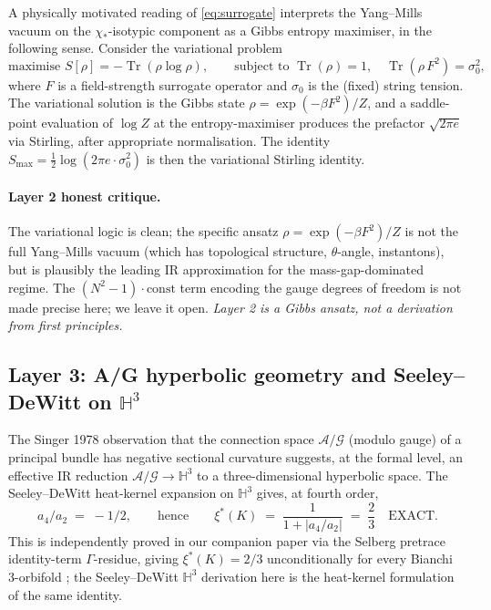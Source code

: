 \documentclass[11pt,a4paper,reqno]{amsart}
\theoremstyle{definition}
\DeclareMathOperator{\Tr}{Tr}
\newcommand{\HH}{\mathbb{H}}
\newcommand{\xis}{\xi^{*}}
\begin{document}
A physically motivated reading of \eqref{eq:surrogate} interprets
the Yang--Mills vacuum on the $\chi_*$-isotypic component as a
Gibbs entropy maximiser, in the following sense. Consider the
variational problem
\[
   \text{maximise } S[\rho] = -\Tr(\rho\log\rho), \qquad
   \text{subject to } \Tr(\rho) = 1, \quad \Tr(\rho\,F^2) = \sigma_0^2,
\]
where $F$ is a field-strength surrogate operator and $\sigma_0$ is
the (fixed) string tension. The variational solution is the Gibbs
state $\rho = \exp(-\beta F^2)/Z$, and a saddle-point evaluation
of $\log Z$ at the entropy-maximiser produces the prefactor
$\sqrt{2\pi e}$ via Stirling, after appropriate normalisation. The
identity $S_{\max} = \tfrac 12\log(2\pi e\cdot \sigma_0^2)$ is then
the variational Stirling identity.

\paragraph{Layer 2 honest critique.}
The variational logic is clean; the specific ansatz $\rho =
\exp(-\beta F^2)/Z$ is not the full Yang--Mills vacuum (which has
topological structure, $\theta$-angle, instantons), but is plausibly
the leading IR approximation for the mass-gap-dominated regime.
The $(N^2-1)\cdot\text{const}$ term encoding the gauge degrees of
freedom is not made precise here; we leave it open. \emph{Layer 2
is a Gibbs ansatz, not a derivation from first principles.}

\subsection{Layer 3: A/G hyperbolic geometry and Seeley--DeWitt
on $\HH^3$}\label{ss:layer3}

The Singer 1978 observation that the connection space
$\mathcal{A}/\mathcal{G}$ (modulo gauge) of a principal bundle has
negative sectional curvature \cite{Singer1978} suggests, at the
formal level, an effective IR reduction $\mathcal{A}/\mathcal{G}
\to \HH^3$ to a three-dimensional hyperbolic space. The
Seeley--DeWitt heat-kernel expansion on $\HH^3$ gives, at fourth
order,
\[
   a_4/a_2 \;=\; -1/2,
   \qquad\text{hence}\qquad
   \xis(K) \;=\; \frac{1}{1 + |a_4/a_2|} \;=\; \frac{2}{3} \quad\text{EXACT.}
\]
This is independently proved in our companion paper
\cite{Remondiere2026CR} via the Selberg pretrace identity-term
$\Gamma$-residue, giving $\xis(K) = 2/3$ unconditionally for every
Bianchi 3-orbifold \cite[Thm.~1.1]{Remondiere2026CR}; the
Seeley--DeWitt $\HH^3$ derivation here is the heat-kernel formulation
of the same identity.
\end{document}
